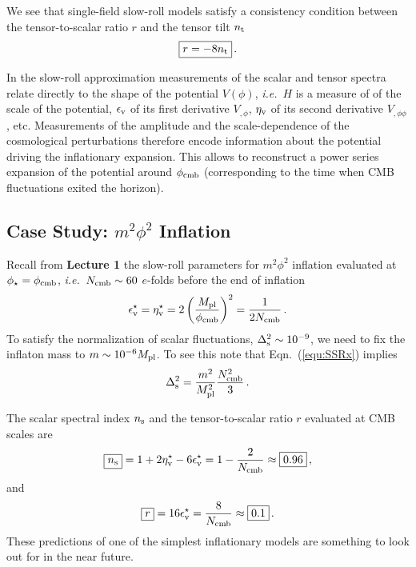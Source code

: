 \documentclass[12pt,letterpaper,rotate]{article}
\def\beq{\begin{equation}}
\def\eeq{\end{equation}}
\def\Mp{M_{\rm pl}}
\begin{document}
{We see that single-field slow-roll models satisfy a consistency condition between the tensor-to-scalar ratio $r$ and the tensor tilt $n_{\rm t}$
\beq
\label{equ:cons}
\fbox{$\displaystyle
r  = - 8 n_{\rm t} $}\, .
\eeq

In the slow-roll approximation measurements of the scalar and tensor spectra relate directly to the shape of the potential $V(\phi)$, {\it i.e.}~$H$ is a measure of of the scale of the potential, $\epsilon_{\rm v}$ of its first derivative $V_{,\phi}$, $\eta_{\rm v}$ of its second derivative $V_{,\phi \phi}$, etc.
Measurements of the amplitude and the scale-dependence of the cosmological perturbations therefore encode information about the potential driving the inflationary expansion.
This allows to reconstruct a power series expansion of the potential around $\phi_{\rm cmb}$ (corresponding to the time when CMB fluctuations exited the horizon).






\subsection{Case Study: $m^2 \phi^2$ Inflation}

Recall from {\bf Lecture 1} the slow-roll parameters for $m^2 \phi^2$ inflation evaluated at $\phi_\star = \phi_{\rm cmb}$, {\it i.e.}~$N_{\rm cmb} \sim 60$ $e$-folds before the end of inflation
\beq
\epsilon_{\rm v}^\star = \eta_{\rm v}^\star = 2 \left(\frac{M_{\rm pl}}{\phi_{\rm cmb}}\right)^2 = \frac{1}{2 N_{\rm cmb}}\, .
\eeq
To satisfy the normalization of scalar fluctuations, $\Delta_{\rm s}^2 \sim 10^{-9}$, we need to fix the inflaton mass to $m\sim 10^{-6} \Mp$.
To see this note that Eqn.~(\ref{equ:SSRx}) implies
\beq
\Delta_{\rm s}^2 = \frac{m^2}{\Mp^2} \frac{N_{\rm cmb}^2}{3}\, .
\eeq

The scalar spectral index $n_{\rm s}$ and the tensor-to-scalar ratio $r$ evaluated at CMB scales are
\begin{align}
\fbox{$\displaystyle n_{\rm s} $} =  1 + 2 \eta_{\rm v}^\star - 6\epsilon_{\rm v}^\star = 1 - \frac{2}{N_{\rm cmb}} \approx \fbox{$\displaystyle 0.96 $}\, ,
\end{align}
and
\begin{align}
\fbox{$\displaystyle r $} = 16 \epsilon_{\rm v}^\star = \frac{8}{N_{\rm cmb}} \approx \fbox{$\displaystyle 0.1 $}\, .
\end{align}
These predictions of one of the simplest inflationary models are something to look out for in the near future.


}
\end{document}
